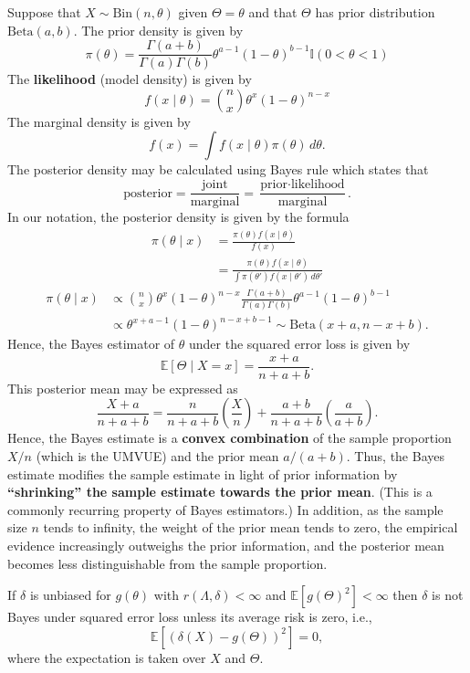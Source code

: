 \begin{exam}
Suppose that $X \sim \text{Bin}(n, \theta)$ given $\Theta = \theta$ and that $\Theta$ has prior distribution $\text{Beta}(a, b)$. The prior density is given by
\[
\pi(\theta) = \frac{\Gamma(a+b)}{\Gamma(a)\Gamma(b)} \theta^{a-1} (1-\theta)^{b-1} \mathbb{I}(0 < \theta < 1)
\]
The \textbf{likelihood} (model density) is given by
\[
f(x \mid \theta) = \binom{n}{x} \theta^x (1-\theta)^{n-x}
\]
The marginal density is given by
\[
f(x) = \int f(x \mid \theta) \pi(\theta) \, d\theta.
\]
The posterior density may be calculated using Bayes rule which states that
\[
\text{posterior} = \frac{\text{joint}}{\text{marginal}} = \frac{\text{prior} \cdot \text{likelihood}}{\text{marginal}}.
\]
In our notation, the posterior density is given by the formula
\begin{align*}
\pi(\theta \mid x) &= \frac{\pi(\theta) f(x \mid \theta)}{f(x)} \\
&= \frac{\pi(\theta) f(x \mid \theta)}{\int \pi(\theta') f(x \mid \theta') \, d\theta'}
\end{align*}
\begin{align*}
\pi(\theta \mid x) &\propto \binom{n}{x} \theta^x (1-\theta)^{n-x} \frac{\Gamma(a+b)}{\Gamma(a)\Gamma(b)} \theta^{a-1} (1-\theta)^{b-1} \\
&\propto \theta^{x+a-1} (1-\theta)^{n-x+b-1} \sim \text{Beta}(x+a, n-x+b).
\end{align*}
Hence, the Bayes estimator of $\theta$ under the squared error loss is given by
\[
\mathbb{E}[\Theta \mid X = x] = \frac{x+a}{n+a+b}.
\]
This posterior mean may be expressed as
\[
\frac{X+a}{n+a+b} = \frac{n}{n+a+b} \left(\frac{X}{n}\right) + \frac{a+b}{n+a+b} \left(\frac{a}{a+b}\right).
\]
Hence, the Bayes estimate is a \textbf{convex combination} of the sample proportion $X/n$ (which is the UMVUE) and the prior mean $a/(a+b)$. Thus, the Bayes estimate modifies the sample estimate in light of prior information by \textbf{``shrinking'' the sample estimate towards the prior mean}. (This is a commonly recurring property of Bayes estimators.) In addition, as the sample size $n$ tends to infinity, the weight of the prior mean tends to zero, the empirical evidence increasingly outweighs the prior information, and the posterior mean becomes less distinguishable from the sample proportion.
\end{exam}
\begin{thm}
If $\delta$ is unbiased for $g(\theta)$ with $r(\Lambda, \delta) < \infty$ and $\mathbb{E}[g(\Theta)^2] < \infty$ then $\delta$ is not Bayes under squared error loss unless its average risk is zero, i.e.,
\[
\mathbb{E}[(\delta(X) - g(\Theta))^2] = 0,
\]
where the expectation is taken over $X$ and $\Theta$.
\end{thm}

